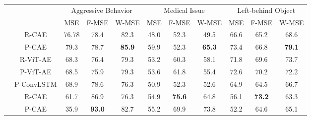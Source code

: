 \documentclass[10pt,twocolumn,letterpaper]{article}
\begin{document}
\begin{table*}[tb]
	\centering
	\begin{tabular}{c c|c|c|c||c|c|c||c|c|c|} \cline{3-11}
		& & \multicolumn{3}{c||}{Aggressive Behavior}    & \multicolumn{3}{c|}{Medical Issue} & \multicolumn{3}{c|}{Left-behind Object}\\ \cline{3-11}
		                                                                                       &                                  & MSE   & F-MSE         & W-MSE         & MSE  & F-MSE         & W-MSE         & MSE  & F-MSE         & W-MSE                 \\ \hline
		\multicolumn{1}{|c}{\multirow{5}{*}{\rotatebox[origin=c]{90}{ \textbf{Tilted View} }}} & \multicolumn{1}{|c|}{R-CAE}      & 76.78 & 78.4          & 82.3          & 48.0 & 52.3          & 49.5          & 66.6 & 65.2          & 68.6                  \\
		\multicolumn{1}{|c}{}                                                                  & \multicolumn{1}{|c|}{P-CAE}      & 79.3  & 78.7          & \textbf{85.9} & 59.9 & 52.3          & \textbf{65.3} & 73.4 & 66.8          & \textbf{79.1}         \\
		\multicolumn{1}{|c}{}                                                                  & \multicolumn{1}{|c|}{R-ViT-AE}   & 68.3  & 76.4          & 79.3          & 53.2 & 60.3          & 58.1          & 71.8 & 69.6          & 73.7                  \\
		\multicolumn{1}{|c}{}                                                                  & \multicolumn{1}{|c|}{P-ViT-AE}   & 68.5  & 75.9          & 79.3          & 53.6 & 61.8          & 55.4          & 72.6 & 70.2          & 72.2                  \\
		\multicolumn{1}{|c}{}                                                                  & \multicolumn{1}{|c|}{P-ConvLSTM} & 68.9  & 78.6          & 76.3          & 50.9 & 52.3          & 52.6          & 64.9 & 64.5          & 66.7                  \\ \hline \hline
		\multicolumn{1}{|c}{\multirow{5}{*}{\rotatebox[origin=c]{90}{ \textbf{Top-Down V.} }}} & \multicolumn{1}{|c|}{R-CAE}      & 61.7  & 86.9          & 76.3          & 54.9 & \textbf{75.6} & 64.8          & 56.1 & \textbf{73.2} & 63.3                  \\
		\multicolumn{1}{|c}{}                                                                  & \multicolumn{1}{|c|}{P-CAE}      & 35.9  & \textbf{93.0} & 82.7          & 55.2 & 69.9          & 73.8          & 52.2 & 64.6          & 65.1                  \\

\end{tabular}
\end{table*}
\end{document}
